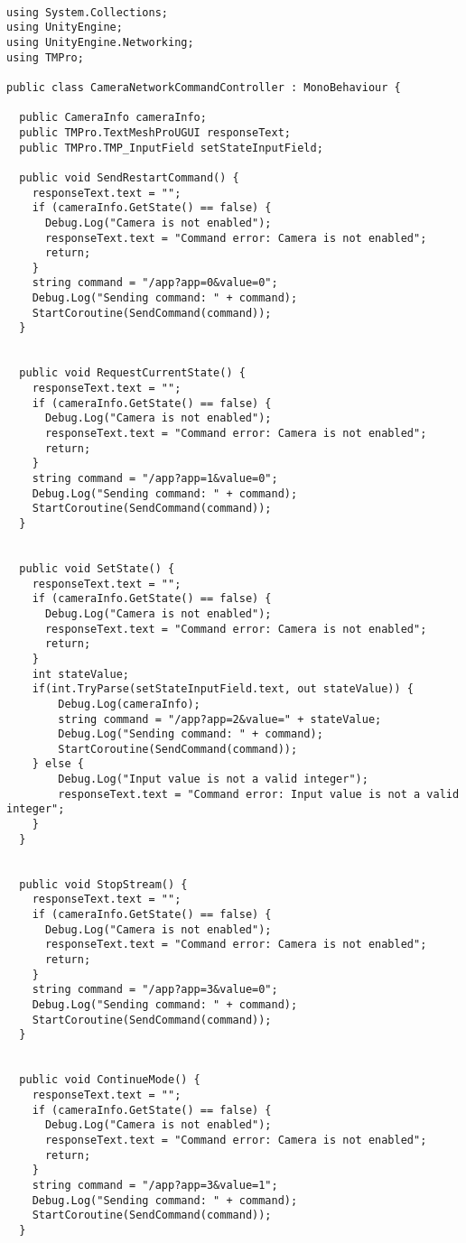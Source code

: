 \begin{lstlisting}[label={lst:CameraNetworkCommandControllerCode}, caption={Código de CameraNetworkCommandController}]

using System.Collections;
using UnityEngine;
using UnityEngine.Networking;
using TMPro;

public class CameraNetworkCommandController : MonoBehaviour {

  public CameraInfo cameraInfo;
  public TMPro.TextMeshProUGUI responseText;
  public TMPro.TMP_InputField setStateInputField;

  public void SendRestartCommand() {
    responseText.text = "";
    if (cameraInfo.GetState() == false) {
      Debug.Log("Camera is not enabled");
      responseText.text = "Command error: Camera is not enabled";
      return;
    }
    string command = "/app?app=0&value=0";
    Debug.Log("Sending command: " + command);
    StartCoroutine(SendCommand(command));
  }


  public void RequestCurrentState() {
    responseText.text = "";
    if (cameraInfo.GetState() == false) {
      Debug.Log("Camera is not enabled");
      responseText.text = "Command error: Camera is not enabled";
      return;
    }
    string command = "/app?app=1&value=0";
    Debug.Log("Sending command: " + command);
    StartCoroutine(SendCommand(command));
  }


  public void SetState() {
    responseText.text = "";
    if (cameraInfo.GetState() == false) {
      Debug.Log("Camera is not enabled");
      responseText.text = "Command error: Camera is not enabled";
      return;
    }
    int stateValue;
    if(int.TryParse(setStateInputField.text, out stateValue)) {
        Debug.Log(cameraInfo);
        string command = "/app?app=2&value=" + stateValue;
        Debug.Log("Sending command: " + command);
        StartCoroutine(SendCommand(command));
    } else {
        Debug.Log("Input value is not a valid integer");
        responseText.text = "Command error: Input value is not a valid integer";
    }
  }


  public void StopStream() {
    responseText.text = "";
    if (cameraInfo.GetState() == false) {
      Debug.Log("Camera is not enabled");
      responseText.text = "Command error: Camera is not enabled";
      return;
    }
    string command = "/app?app=3&value=0";
    Debug.Log("Sending command: " + command);
    StartCoroutine(SendCommand(command));
  }


  public void ContinueMode() {
    responseText.text = "";
    if (cameraInfo.GetState() == false) {
      Debug.Log("Camera is not enabled");
      responseText.text = "Command error: Camera is not enabled";
      return;
    }
    string command = "/app?app=3&value=1";
    Debug.Log("Sending command: " + command);
    StartCoroutine(SendCommand(command));
  }



\end{lstlisting}
